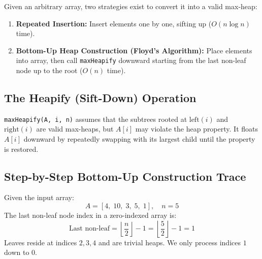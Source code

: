 Given an arbitrary array, two strategies exist to convert it into a valid max-heap:
\begin{enumerate}
    \item \textbf{Repeated Insertion:} Insert elements one by one, sifting up ($O(n \log n)$ time).
    \item \textbf{Bottom-Up Heap Construction (Floyd's Algorithm):} Place elements into array, then call \texttt{maxHeapify} downward starting from the last non-leaf node up to the root ($O(n)$ time).
\end{enumerate}

\subsection{The Heapify (Sift-Down) Operation}

\texttt{maxHeapify(A, i, n)} assumes that the subtrees rooted at $\text{left}(i)$ and $\text{right}(i)$ are valid max-heaps, but $A[i]$ may violate the heap property. It floats $A[i]$ downward by repeatedly swapping with its largest child until the property is restored.

\subsection{Step-by-Step Bottom-Up Construction Trace}

Given the input array:
\[
A = [4, \; 10, \; 3, \; 5, \; 1], \quad n = 5
\]
The last non-leaf node index in a zero-indexed array is:
\[
\text{Last non-leaf} = \left\lfloor \frac{n}{2} \right\rfloor - 1 = \left\lfloor \frac{5}{2} \right\rfloor - 1 = 1
\]
Leaves reside at indices $2, 3, 4$ and are trivial heaps. We only process indices $1$ down to $0$.

